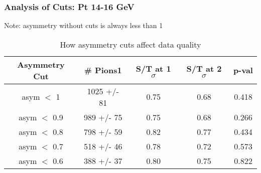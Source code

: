 \frame
{
\frametitle{Analysis of Cuts: Pt 14-16 GeV}
Note: asymmetry without cuts is always less than 1
\begin{table}
\caption{How asymmetry cuts affect data quality}
\centering
\begin{tabular}{c c c c c}
\hline\hline
Asymmetry Cut & \# Pions1 & S/T at 1 $\sigma$ & S/T at 2 $\sigma$ & p-val \\ [0.5ex]
\hline
asym $<$ 1 & 1025 +/-   81 & 0.75 & 0.68 & 0.418 \\ %
asym $<$ 0.9 &  989 +/-   75 & 0.75 & 0.68 & 0.266 \\ %
asym $<$ 0.8 &  798 +/-   59 & 0.82 & 0.77 & 0.434 \\ %
asym $<$ 0.7 &  518 +/-   46 & 0.78 & 0.72 & 0.573 \\ %
asym $<$ 0.6 &  388 +/-   37 & 0.80 & 0.75 & 0.822 \\ %
[1ex]
\hline
\end{tabular}
\label{table:nonlin}
\end{table}
}
